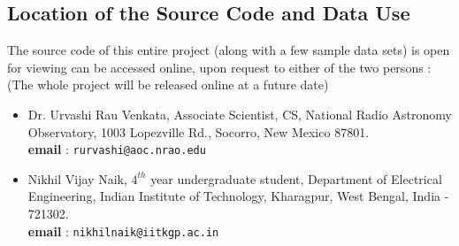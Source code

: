\documentclass{article}
\begin{document}
\subsection{Location of the Source Code and Data Use}
The source code of this entire project (along with a few sample data sets) is open for viewing can be accessed online, upon request to either of the two persons : (The whole project will be released online at a future date)
\begin{itemize}
\item Dr. Urvashi Rau Venkata, Associate Scientist, CS, National Radio Astronomy Observatory, 1003 Lopezville Rd., Socorro, New Mexico 87801.\\\textbf{email} : \texttt{rurvashi@aoc.nrao.edu}
\item Nikhil Vijay Naik, $4^{th}$ year undergraduate student, Department of Electrical Engineering, Indian Institute of Technology, Kharagpur, West Bengal, India - 721302.\\\textbf{email} : \texttt{nikhilnaik@iitkgp.ac.in}
\end{itemize}
\end{document}
